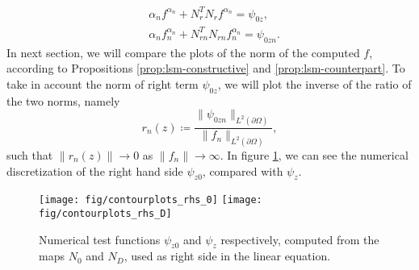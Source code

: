 \documentclass[10pt, a4paper, twoside, openright]{book}
\theoremstyle{definition}
\theoremstyle{plain}
\theoremstyle{plain}
\theoremstyle{plain}
\theoremstyle{plain}
\theoremstyle{plain}
\theoremstyle{plain}
\theoremstyle{plain}
\theoremstyle{plain}
\begin{document}
\begin{align}
 &\alpha_n f^{\alpha_n} + N_r^TN_rf^{\alpha_n} = \psi_{0z}\label{eq:tikh-reg-lsm}, \\
 &\alpha_n f_n^{\alpha_n} + N_{rn}^TN_{rn}f_n^{\alpha_n} = \psi_{0zn}\label{eq:tikh-reg-lsm-discrete}.
\end{align}
In next section, we will compare the plots of the norm of the computed $f$, according to Propositions
\ref{prop:lsm-constructive} and \ref{prop:lsm-counterpart}. To take in account the norm of right term 
$\psi_{0z}$, we will plot the inverse of the ratio of the two norms, namely
\begin{equation}
 r_n(z)\coloneqq\frac{\|\psi_{0zn}\|_{L^2(\partial \Omega)}}{\|f_n\|_{L^2(\partial \Omega)}},
\end{equation}
such that $\|r_n(z)\|\to 0$ as $\|f_n\|\to \infty$.
In figure \ref{fig:contourplots_rhs}, we can see the numerical discretization of the right hand side $\psi_{z0}$, 
compared with $\psi_{z}$.


\begin{center}
\begin{figure}[]
{
\texttt{[image: fig/contourplots\_rhs\_0]}
}
{
\texttt{[image: fig/contourplots\_rhs\_D]}
}
\caption{Numerical test functions $\psi_{z0}$ and $\psi_z$ respectively, computed from
the maps $N_0$ and $N_D$, used as right side in the linear equation.}
\label{fig:contourplots_rhs}
\end{figure}
\end{center}


% 
\end{document}
